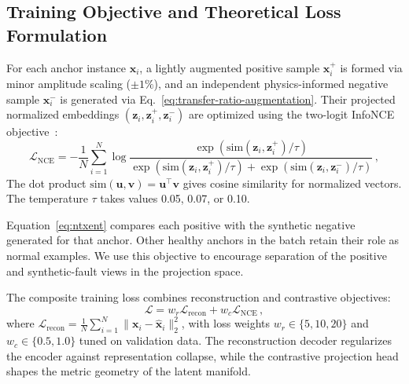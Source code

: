 \documentclass[11pt,a4paper]{article}
\begin{document}
\subsection{Training Objective and Theoretical Loss Formulation}
\label{sec:objective}
For each anchor instance $\mathbf{x}_i$, a lightly augmented positive sample $\mathbf{x}_i^+$ is formed via minor amplitude scaling ($\pm 1\%$), and an independent physics-informed negative sample $\mathbf{x}_i^-$ is generated via Eq.~\eqref{eq:transfer-ratio-augmentation}. Their projected normalized embeddings $(\mathbf{z}_i, \mathbf{z}_i^+, \mathbf{z}_i^-)$ are optimized using the two-logit InfoNCE objective~\cite{oord2018representation,chen2020simclr}:
\begin{equation}
\mathcal{L}_{\mathrm{NCE}} = -\frac{1}{N} \sum_{i=1}^N \log \frac{\exp\left(\mathrm{sim}(\mathbf{z}_i, \mathbf{z}_i^+) / \tau\right)}{\exp\left(\mathrm{sim}(\mathbf{z}_i, \mathbf{z}_i^+) / \tau\right) + \exp\left(\mathrm{sim}(\mathbf{z}_i, \mathbf{z}_i^-) / \tau\right)}\,,
\label{eq:ntxent}
\end{equation}
The dot product $\mathrm{sim}(\mathbf{u},\mathbf{v})=\mathbf{u}^\top\mathbf{v}$ gives cosine similarity for normalized vectors. The temperature $\tau$ takes values 0.05, 0.07, or 0.10.

Equation~\eqref{eq:ntxent} compares each positive with the synthetic negative generated for that anchor. Other healthy anchors in the batch retain their role as normal examples. We use this objective to encourage separation of the positive and synthetic-fault views in the projection space.

The composite training loss combines reconstruction and contrastive objectives:
\begin{equation}
\mathcal{L} = w_r \mathcal{L}_{\mathrm{recon}} + w_c \mathcal{L}_{\mathrm{NCE}}\,,
\label{eq:combined-loss}
\end{equation}
where $\mathcal{L}_{\mathrm{recon}} = \frac{1}{N} \sum_{i=1}^N \|\mathbf{x}_i - \hat{\mathbf{x}}_i\|_2^2$, with loss weights $w_r \in \{5, 10, 20\}$ and $w_c \in \{0.5, 1.0\}$ tuned on validation data. The reconstruction decoder regularizes the encoder against representation collapse, while the contrastive projection head shapes the metric geometry of the latent manifold.
\end{document}
